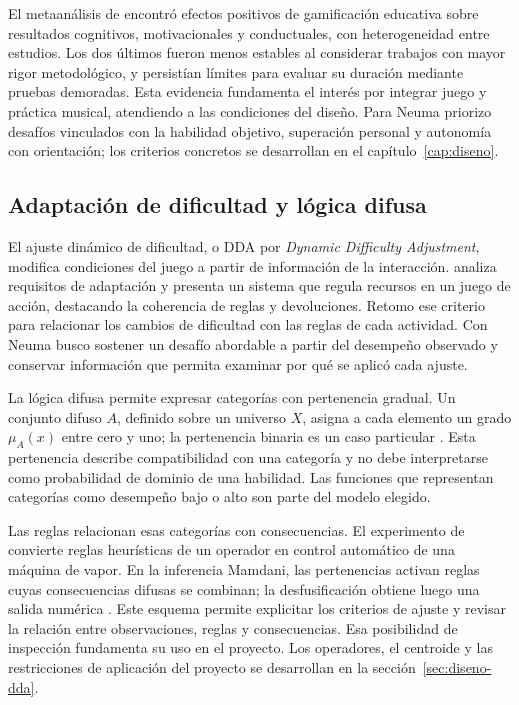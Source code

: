 El metaanálisis de \textcite{sailer2020gamification} encontró efectos positivos
de gamificación educativa sobre resultados cognitivos, motivacionales y conductuales,
con heterogeneidad entre estudios. Los dos últimos fueron menos estables al
considerar trabajos con mayor rigor metodológico, y persistían límites para evaluar
su duración mediante pruebas demoradas. Esta evidencia fundamenta el interés
por integrar juego y práctica musical, atendiendo a las condiciones del diseño.
Para Neuma priorizo desafíos vinculados con la habilidad objetivo, superación
personal y autonomía con orientación; los criterios concretos se desarrollan
en el capítulo~\ref{cap:diseno}.

\subsection{Adaptación de dificultad y lógica difusa}
\label{sec:desafio-dda}
\label{sec:conjuntos-difusos}
El ajuste dinámico de dificultad, o DDA por \textit{Dynamic Difficulty Adjustment},
modifica condiciones del juego a partir de información de la interacción.
\textcite{hunicke2005dda} analiza requisitos de adaptación y presenta un sistema
que regula recursos en un juego de acción, destacando la coherencia de reglas y
devoluciones. Retomo ese criterio para relacionar los cambios de dificultad con
las reglas de cada actividad. Con Neuma busco sostener un desafío abordable a
partir del desempeño observado y conservar información que permita examinar
por qué se aplicó cada ajuste.

La lógica difusa permite expresar categorías con pertenencia gradual. Un conjunto
difuso \(A\), definido sobre un universo \(X\), asigna a cada elemento un grado
\(\mu_A(x)\) entre cero y uno; la pertenencia binaria es un caso particular
\parencite[pp.~338--340]{zadeh1965fuzzy}. Esta pertenencia describe compatibilidad
con una categoría y no debe interpretarse como probabilidad de dominio de una
habilidad. Las funciones que representan categorías como desempeño bajo o alto
son parte del modelo elegido.

Las reglas relacionan esas categorías con consecuencias. El experimento de
\textcite{mamdani1975linguistic} convierte reglas heurísticas de un operador en
control automático de una máquina de vapor. En la inferencia Mamdani, las
pertenencias activan reglas cuyas consecuencias difusas se combinan; la
desfusificación obtiene luego una salida numérica
\parencite{mathworksProcesoDifuso,mathworksDesfusificacion}. Este esquema permite
explicitar los criterios de ajuste y revisar la relación entre observaciones,
reglas y consecuencias. Esa posibilidad de inspección fundamenta su uso en el
proyecto. Los operadores, el centroide y las restricciones
de aplicación del proyecto se desarrollan en la sección~\ref{sec:diseno-dda}.

